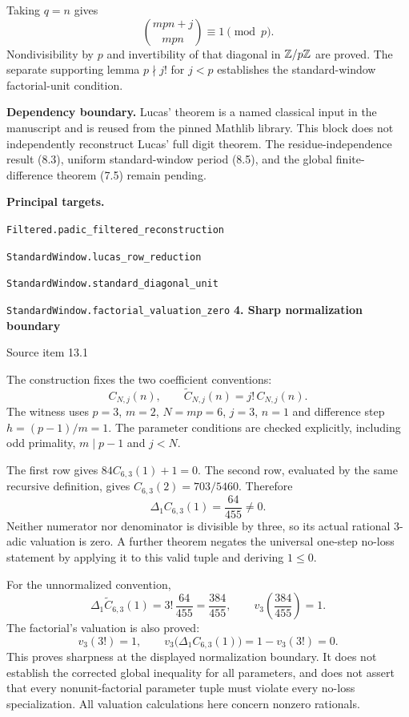 \documentclass[11pt]{article}
\newcommand{\target}[1]{{\footnotesize\texttt{#1}}}
\newcommand{\pageheading}[2]{{\Large\bfseries\color{ink}#1}\par{\small #2}\par\medskip}
\begin{document}
Taking $q=n$ gives
\[
 \binom{mpn+j}{mpn}\equiv1\pmod p.
\]
Nondivisibility by $p$ and invertibility of that diagonal in $\mathbb Z/p\mathbb Z$ are proved. The separate supporting lemma $p\nmid j!$ for $j<p$ establishes the standard-window factorial-unit condition.

\textbf{Dependency boundary.} Lucas' theorem is a named classical input in the manuscript and is reused from the pinned Mathlib library. This block does not independently reconstruct Lucas' full digit theorem. The residue-independence result (8.3), uniform standard-window period (8.5), and the global finite-difference theorem (7.5) remain pending.

\textbf{Principal targets.}\par
\target{Filtered.padic\_filtered\_reconstruction}\par
\target{StandardWindow.lucas\_row\_reduction}\par
\target{StandardWindow.standard\_diagonal\_unit}\par
\target{StandardWindow.factorial\_valuation\_zero}
\newpage
\pageheading{4. Sharp normalization boundary}{Source item 13.1}
The construction fixes the two coefficient conventions:
\[
 C_{N,j}(n),\qquad \widetilde C_{N,j}(n)=j!\,C_{N,j}(n).
\]
The witness uses $p=3$, $m=2$, $N=mp=6$, $j=3$, $n=1$ and difference step $h=(p-1)/m=1$. The parameter conditions are checked explicitly, including odd primality, $m\mid p-1$ and $j<N$.

The first row gives $84C_{6,3}(1)+1=0$. The second row, evaluated by the same recursive definition, gives $C_{6,3}(2)=703/5460$. Therefore
\[
 \Delta_1 C_{6,3}(1)=\frac{64}{455}\ne0.
\]
Neither numerator nor denominator is divisible by three, so its actual rational 3-adic valuation is zero. A further theorem negates the universal one-step no-loss statement by applying it to this valid tuple and deriving $1\le0$.

For the unnormalized convention,
\[
 \Delta_1\widetilde C_{6,3}(1)=3!\,\frac{64}{455}=\frac{384}{455},
 \qquad v_3\!\left(\frac{384}{455}\right)=1.
\]
The factorial's valuation is also proved:
\[
 v_3(3!)=1,\qquad
 v_3\bigl(\Delta_1C_{6,3}(1)\bigr)
 =1-v_3(3!)=0.
\]
This proves sharpness at the displayed normalization boundary. It does not establish the corrected global inequality for all parameters, and does not assert that every nonunit-factorial parameter tuple must violate every no-loss specialization. All valuation calculations here concern nonzero rationals.
\end{document}
